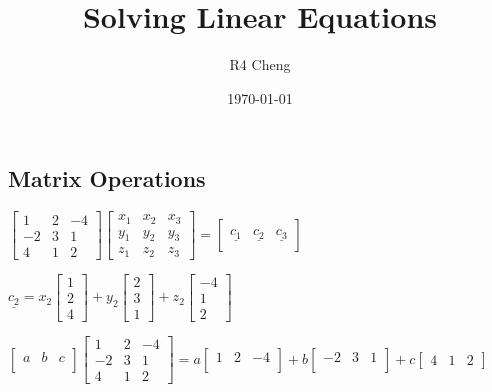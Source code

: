 \documentclass[12pt,a4paper]{article}
\title{Solving Linear Equations}
\author{R4 Cheng}
\date{\today}
\begin{document}
\maketitle

\subsection*{Matrix Operations}

$
\begin{bmatrix}
  1 & 2 & -4 \\
  -2 & 3 & 1 \\
  4 & 1 & 2
\end{bmatrix}
\begin{bmatrix}
  x_1 & x_2 & x_3 \\
  y_1 & y_2 & y_3 \\
  z_1 & z_2 & z_3 
\end{bmatrix} = 
\begin{bmatrix}
  & \\
  \underline{c_1} & \underline{c_2} & \underline{c_3} \\
  &
\end{bmatrix}
$

$
\underline{c_2} = 
x_2
\begin{bmatrix}
  1 \\
  2 \\
  4
\end{bmatrix} + 
y_2
\begin{bmatrix}
  2 \\
  3 \\
  1
\end{bmatrix} +
z_2
\begin{bmatrix}
  -4 \\
  1 \\
  2
\end{bmatrix}
$

$
\begin{bmatrix}
  a & b & c \\
\end{bmatrix}
\begin{bmatrix}
  1 & 2 & -4 \\
  -2 & 3 & 1 \\
  4 & 1 & 2
\end{bmatrix} = 
a
\begin{bmatrix}
  1 & 2 & -4 \\
\end{bmatrix} +
b
\begin{bmatrix}
  -2 & 3 & 1 \\
\end{bmatrix} +
c
\begin{bmatrix}
  4 & 1 & 2
\end{bmatrix}
$
\end{document}
